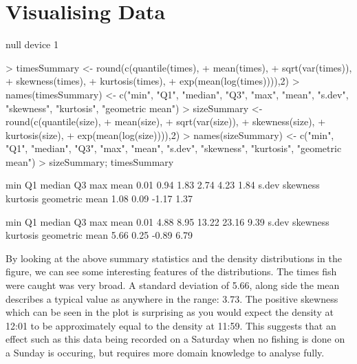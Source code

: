 \documentclass{article}
\begin{document}
\section{Visualising Data}
\begin{Schunk}
\begin{Soutput}
null device 
          1 
\end{Soutput}
\end{Schunk}
\begin{Schunk}
\begin{Sinput}
> timesSummary <- round(c(quantile(times),
+ mean(times),
+ sqrt(var(times)),
+ skewness(times),
+ kurtosis(times),
+ exp(mean(log(times)))),2)
> names(timesSummary) <- c("min", "Q1", "median", "Q3", "max", "mean", "s.dev", "skewness", "kurtosis", "geometric mean")
> sizeSummary <- round(c(quantile(size),
+ mean(size),
+ sqrt(var(size)),
+ skewness(size),
+ kurtosis(size),
+ exp(mean(log(size)))),2)
> names(sizeSummary) <- c("min", "Q1", "median", "Q3", "max", "mean", "s.dev", "skewness", "kurtosis", "geometric mean")
> sizeSummary; timesSummary
\end{Sinput}
\begin{Soutput}
           min             Q1         median             Q3            max           mean 
          0.01           0.94           1.83           2.74           4.23           1.84 
         s.dev       skewness       kurtosis geometric mean 
          1.08           0.09          -1.17           1.37 
\end{Soutput}
\begin{Soutput}
           min             Q1         median             Q3            max           mean 
          0.01           4.88           8.95          13.22          23.16           9.39 
         s.dev       skewness       kurtosis geometric mean 
          5.66           0.25          -0.89           6.79 
\end{Soutput}
\end{Schunk}
By looking at the above summary statistics and the density distributions in the figure, we can see some interesting features of the distributions. The times fish were caught was very broad. A standard deviation of 5.66, along side the mean describes a typical value as anywhere in the range: 3.73. The positive skewness which can be seen in the plot is surprising as you would expect the density at 12:01 to be approximately equal to the density at 11:59. This suggests that an effect such as this data being recorded on a Saturday when no fishing is done on a Sunday is occuring, but requires more domain knowledge to analyse fully. 
\end{document}
